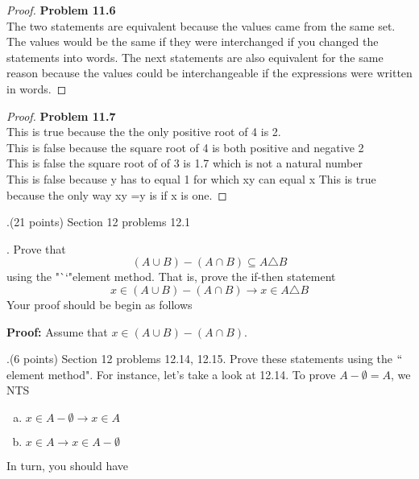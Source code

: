 \documentclass[12pt]{article}
\begin{document}
\begin{proof}
\textbf{Problem 11.6}\\
The two statements are equivalent because the values came from the same set. The values would be the same if they were interchanged if you changed the statements into words. The next statements are also equivalent for the same reason because the values could be interchangeable if the expressions were written in words.

\end{proof}

\begin{proof}
\textbf{Problem 11.7}\\
 This is true because the the only positive root of 4 is 2.\\
 This is false because the square root of 4 is both positive and negative 2\\
 This is false the square root of of 3 is 1.7 which is not a natural number\\
 This is false because y has to equal 1 for which xy can equal x
 This is true because the only way xy =y is if x is one. 

\end{proof}

.(21 points)  Section 12 problems 12.1
\vspace{.15in}




.  Prove that 
\[
(A \cup B) - (A \cap B) \subseteq A \triangle B
\]
using the "``"element method.  That is, prove the if-then statement 
\[
x \in (A \cup B) - (A \cap B) \longrightarrow x \in A \triangle B
\]
Your proof should be begin as follows 
\vspace{.15in}

\noindent \textbf{Proof:}  Assume that $x \in (A \cup B) - (A \cap B)$.  
\vspace{.15in}



.(6 points)  Section 12 problems 12.14, 12.15.  Prove these statements using the $``$element method".  For instance, let's take a look at 12.14.  To prove $A - \emptyset = A$, we NTS
\begin{enumerate}[(a).]
    \item \textit{$x \in A - \emptyset \longrightarrow x \in A$}
    \item \textit{$x \in A \longrightarrow x \in A - \emptyset$}
\end{enumerate}
In turn, you should have 
\vspace{.15in}
\end{document}
